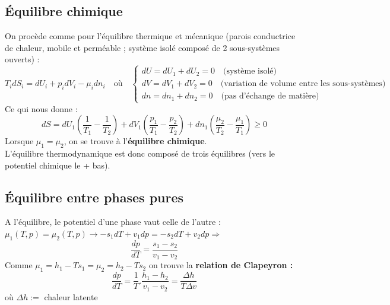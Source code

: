 \documentclass[british,french,11pt, a4paper, openany]{book}
\begin{document}
	\subsection{Équilibre chimique}
	On procède comme pour l'équilibre thermique et mécanique (parois conductrice de chaleur, mobile et perméable ; système isolé composé de 2 sous-systèmes ouverts) :
	\begin{equation}
	T_idS_i = dU_i + p_idV_i - \mu_idn_i\quad\text{où}\quad\left\{\begin{array}{l}
	dU = dU_1 + dU_2 = 0\quad\text{(système isolé)}\\
	dV = dV_1 + dV_2 = 0\quad\text{(variation de volume entre les sous-systèmes)}\\
	dn = dn_1 + dn_2 = 0\quad\text{(pas d'échange de matière)}
	\end{array}\right.
	\end{equation}
	Ce qui nous donne : 
	\begin{equation}
	dS = dU_1\left(\frac{1}{T_1}-\frac{1}{T_2}\right) + dV_1 \left(\frac{p_1}{T_1}-\frac{p_2}{T_2}\right) + dn_1\left(\frac{\mu_2}{T_2}-\frac{\mu_1}{T_1}\right) \geq 0
	\end{equation}
	Lorsque $\mu_1 = \mu_2$, on se trouve à l'\textbf{équilibre chimique}.\\
	L'équilibre thermodynamique est donc composé de trois équilibres (vers le potentiel chimique le + bas).
	
	\subsection{Équilibre entre phases pures}
	A l'équilibre, le potentiel d'une phase vaut celle de l'autre : $\mu_1(T, p) = \mu_2(T,p) \rightarrow -s_1dT + v_1dp = -s_2dT + v_2dp \Rightarrow$
	\begin{equation}
	\frac{dp}{dT} = \frac{s_1 - s_2}{v_1 - v_2}
	\end{equation}
	Comme $\mu_1 = h_1 - Ts_1 = \mu_2 = h_2 - Ts_2$ on trouve la \textbf{relation de Clapeyron :}
	\begin{equation}
	\frac{dp}{dT} = \frac{1}{T}.\frac{h_1 - h_2}{v_1 - v_2} = \frac{\Delta h}{T\Delta v}
	\end{equation}
	où $\Delta h:=$ chaleur latente
\end{document}
